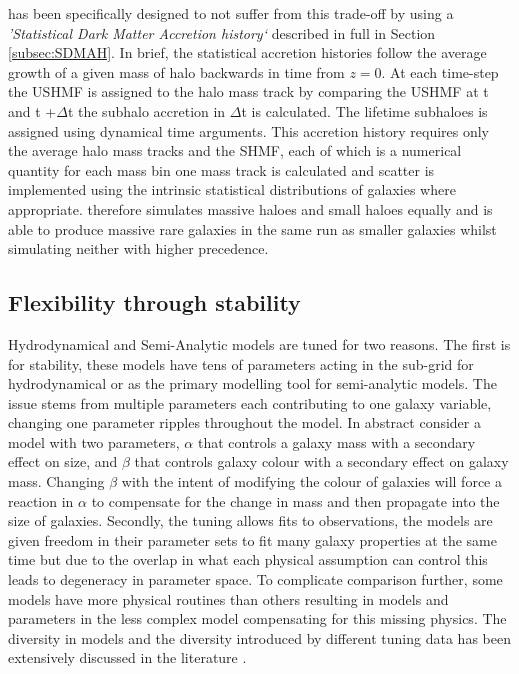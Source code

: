 \steel has been specifically designed to not suffer from this trade-off by using a \textit{'Statistical Dark Matter Accretion history`} described in full in Section \ref{subsec:SDMAH}. In brief, the statistical accretion histories follow the average growth of a given mass of halo backwards in time from $z = 0$. At each time-step the USHMF is assigned to the halo mass track by comparing the USHMF at t and t +$\Delta$t the subhalo accretion in $\Delta$t is calculated. The lifetime subhaloes is assigned using dynamical time arguments. This accretion history requires only the average halo mass tracks and the SHMF, each of which is a numerical quantity for each mass bin one mass track is calculated and scatter is implemented using the intrinsic statistical distributions of galaxies where appropriate. \steel therefore simulates massive haloes and small haloes equally and is able to produce massive rare galaxies in the same run as smaller galaxies whilst simulating neither with higher precedence.

\subsection{Flexibility through stability}
Hydrodynamical and Semi-Analytic models are tuned for two reasons. The first is for stability, these models have tens of parameters acting in the sub-grid for hydrodynamical or as the primary modelling tool for semi-analytic models. The issue stems from multiple parameters each contributing to one galaxy variable, changing one parameter ripples throughout the model. In abstract consider a model with two parameters, $\alpha$ that controls a galaxy mass with a secondary effect on size, and $\beta$ that controls galaxy colour with a secondary effect on galaxy mass. Changing $\beta$ with the intent of modifying the colour of galaxies will force a reaction in $\alpha$ to compensate for the change in mass and then propagate into the size of galaxies. Secondly, the tuning allows fits to observations, the models are given freedom in their parameter sets to fit many galaxy properties at the same time but due to the overlap in what each physical assumption can control this leads to degeneracy in parameter space. To complicate comparison further, some models have more physical routines than others resulting in models and parameters in the less complex model compensating for this missing physics. The diversity in models and the diversity introduced by different tuning data has been extensively discussed in the literature \cite{Knebe2015NIFTyModels,Cui2018TheApplications,Knebe2018CosmicModels}.   

